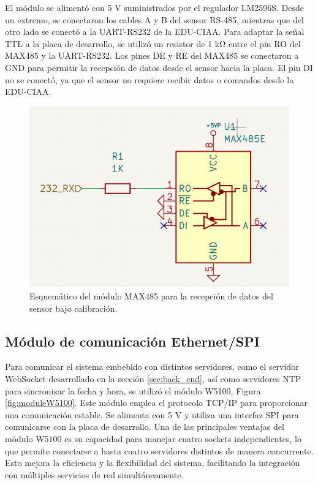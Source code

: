  El módulo se alimentó con 5 \unit{\volt} suministrados por el regulador LM2596S. Desde un extremo, se conectaron los cables A y B del sensor RS-485, mientras que del otro lado se conectó a la UART-RS232 de la EDU-CIAA. Para adaptar la señal TTL a la placa de desarrollo, se utilizó un resistor de 1 \unit{\kilo\ohm} entre el pin RO del MAX485 y la UART-RS232. Los pines DE y RE del MAX485 se conectaron a GND para permitir la recepción de datos desde el sensor hacia la placa. El pin DI no se conectó, ya que el sensor no requiere recibir datos o comandos desde la EDU-CIAA.

\begin{figure}[H]
    \centering
    \includegraphics[width=0.5\linewidth]{Figuras/datalogger/Hardware/esquemRS485.png}
    \caption{Esquemático del módulo MAX485 para la recepción de datos del sensor bajo calibración.}
    \label{fig:esquemRS485}
\end{figure}


\subsection{Módulo de comunicación Ethernet/SPI  }\label{sec:moduloEthernet}

Para comunicar el sistema embebido con distintos servidores, como el servidor WebSocket desarrollado en la sección \ref{sec:back_end}, así como servidores NTP para sincronizar la fecha y hora, se utilizó el módulo W5100, Figura \ref{fig:moduleW5100}. Este módulo emplea el protocolo TCP/IP para proporcionar una comunicación estable. Se alimenta con 5 \unit{\volt} y utiliza una interfaz SPI para comunicarse con la placa de desarrollo. Una de las principales ventajas del módulo W5100 \cite{W5100Datasheet} es su capacidad para manejar cuatro sockets independientes, lo que permite conectarse a hasta cuatro servidores distintos de manera concurrente. Esto mejora la eficiencia y la flexibilidad del sistema, facilitando la integración con múltiples servicios de red simultáneamente.



